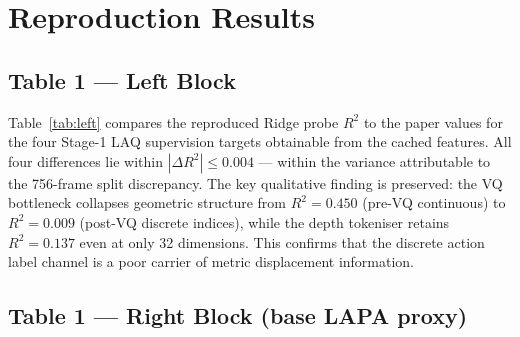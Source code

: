 \documentclass[11pt]{article}
\begin{document}
\section{Reproduction Results}

\subsection{Table 1 --- Left Block}

Table~\ref{tab:left} compares the reproduced Ridge probe $R^2$ to the paper
values for the four Stage-1 LAQ supervision targets obtainable from the cached
features. All four differences lie within $|\Delta R^2| \le 0.004$ --- within the
variance attributable to the 756-frame split discrepancy.
The key qualitative finding is preserved: the VQ bottleneck collapses geometric
structure from $R^2{=}0.450$ (pre-VQ continuous) to $R^2{=}0.009$ (post-VQ
discrete indices), while the depth tokeniser retains $R^2{=}0.137$ even at
only 32 dimensions. This confirms that the discrete action label channel is a poor carrier of
metric displacement information.

\begin{table}[H]
\centering
\small
\caption{Table~1 left block: Stage-1 LAQ supervision targets.
$^{\dagger}$Requires finetuned LAPA checkpoint absent from cached features.}
\label{tab:left}
\renewcommand{\arraystretch}{1.2}
\end{table}

\subsection{Table 1 --- Right Block (base LAPA proxy)}
\end{document}
